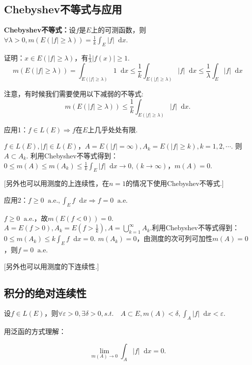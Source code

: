 \documentclass[bwprint, withoutpreface]{cumcmthesis}
\newcommand*{\dif}{\mathop{}\!\mathrm{d}}
\begin{document}
\subsection{Chebyshev不等式与应用}
\indent \textbf{Chebyshev不等式：}设$f$是$E$上的可测函数，则$\forall \lambda > 0, m(E(|f| \geqslant \lambda)) = \frac{1}{k} \int_E |f| \dif x$.

证明：$x \in E(|f| \geqslant \lambda)$，有$\frac{1}{\lambda}|f(x)| \geqslant 1$.
\begin{equation*}
	m(E(|f| \geqslant \lambda)) = \int_{E(|f| \geqslant \lambda)} 1 \dif x \leqslant \frac{1}{k}\int_{E(|f| \geqslant \lambda)} |f| \dif x \leqslant \frac{1}{\lambda} \int_E |f| \dif x
\end{equation*}

注意，有时候我们需要使用以下减弱的不等式:
\begin{equation*}
	m(E(|f| \geqslant \lambda)) \leqslant \frac{1}{k}\int_{E(|f| \geqslant \lambda)} |f| \dif x.
\end{equation*}

应用1：$f \in L(E) \Rightarrow f$在$E$上几乎处处有限.

$f \in L(E), |f| \in L(E)$，$A = E(|f| = \infty), A_k = E(|f| \geqslant k), k = 1, 2, \cdots$. 则$A \subset A_k$. 利用Chebyshev不等式得到：$0 \leqslant m(A) \leqslant m(A_k) \leqslant \frac{1}{k} \int_E |f| \dif x \to 0, (k \to \infty)$，$m(A) = 0$.

[另外也可以用测度的上连续性，在$n = 1$的情况下使用Chebyshev不等式.]

应用2：$f \geqslant 0 \mathop{} \! \mathrm{a.e.}, \int_E f \dif x \Rightarrow f = 0 \mathop{} \! \mathrm{a.e.}$

$f \geqslant 0 \mathop{} \! \mathrm{a.e.}$，故$m(E(f < 0)) = 0$.$A = E(f > 0), A_k = E(f > \frac{1}{k}), A = \bigcup_{k = 1}^{\infty}{A_k}$.利用Chebyshev不等式得到：$0 \leqslant m(A_k) \leqslant k \int_E f \dif x = 0$. $m(A_k) = 0$，由测度的次可列可加性$m(A) = 0$，则$f = 0 \mathop{} \! \mathrm{a.e.}$

[另外也可以用测度的下连续性.]

\subsection{积分的绝对连续性}
设$f \in L(E)$，则$\forall \varepsilon > 0, \exists \delta > 0, s.t. \quad A \subset E, m(A) < \delta, \int_A |f| \dif x < \varepsilon.$

用泛函的方式理解：

\begin{equation*}
	\lim_{m(A) \to 0}{\int_A |f| \dif x = 0}.
\end{equation*}
\end{document}
